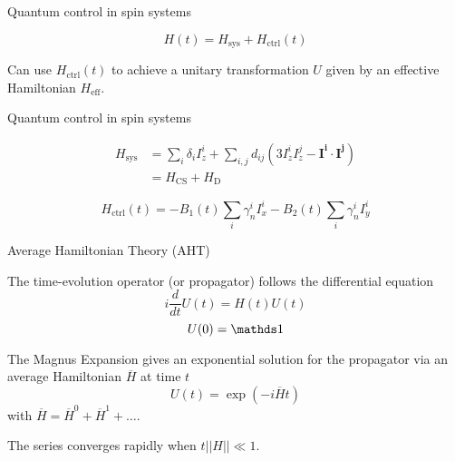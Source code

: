 \documentclass{beamer}
\begin{document}
\begin{frame}{Quantum control in spin systems}

\[
    H(t) = H_{\text{sys}} + H_{\text{ctrl}}(t)
\]

Can use $H_{\text{ctrl}}(t)$ to achieve
a unitary transformation $U$ given by an effective Hamiltonian $H_\text{eff}$.

\begin{figure}
\centering

\end{figure}

\end{frame}


\begin{frame}{Quantum control in spin systems}


\begin{align*}
    H_{\text{sys}} &= \sum_i \delta_i I_z^i + \sum_{i,j} d_{ij} \left( 3I_z^iI_z^j - \mathbf{I^i} \cdot \mathbf{I^j} \right) \\
        &= H_\text{CS} + H_\text{D}
\end{align*}

\[
    H_{\text{ctrl}}(t) = -B_1(t) \sum_i \gamma_n^i I_x^i -B_2(t) \sum_i \gamma_n^i I_y^i
\]

\end{frame}


\begin{frame}{Average Hamiltonian Theory (AHT)}

The time-evolution operator (or propagator) follows the differential
equation \[
i \frac{d}{dt} U(t) = H(t)U(t)
\] \[
U(0) = \identity
\]

The Magnus Expansion gives an exponential solution for the propagator
via an average Hamiltonian \(\overline{H}\) at time \(t\) \[
U(t) = \exp\left( -i \overline{H} t \right)
\] with \(\overline{H} = \overline{H}^0 + \overline{H}^1 + \dots\).

The series converges rapidly when \(t||H|| \ll 1\).

\end{frame}
\end{document}
